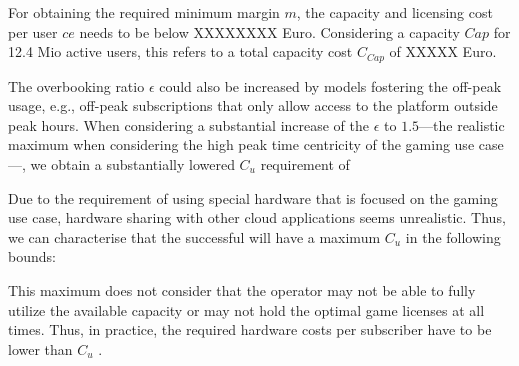 

For obtaining the required minimum margin $m$, the capacity and licensing cost per user $ce$ needs to be below XXXXXXXX Euro. Considering a capacity $Cap$ for 12.4 Mio active users, this refers to a total capacity cost $C_{Cap}$ of XXXXX Euro.

The overbooking ratio $\epsilon$ could also be increased by models fostering the off-peak usage, e.g., off-peak subscriptions that only allow access to the platform outside peak hours. When considering a substantial increase of the $\epsilon$ to $1.5$---the realistic maximum when considering the high peak time centricity of the gaming use case---, we obtain a substantially lowered $C_{u}$ requirement of 


Due to the requirement of using special hardware that is focused on the gaming use case, hardware sharing with other cloud applications seems unrealistic. Thus, we can characterise that the successful will have a maximum $C_{u}$ in the following bounds:


This maximum does not consider that the operator may not be able to fully utilize the available capacity or may not hold the optimal game licenses at all times. Thus, in practice, the required hardware costs per subscriber have to be lower than $C_{u}$ .




